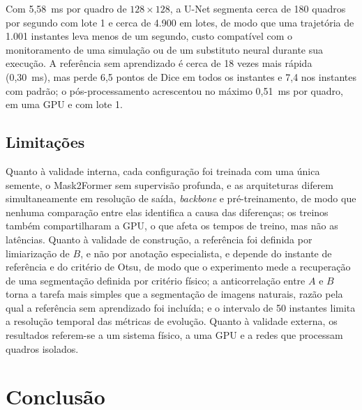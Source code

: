 \documentclass[final,5p,times,twocolumn]{elsarticle}
\begin{document}
Com 5,58~ms por quadro de $128\times128$, a U-Net segmenta cerca de 180 quadros por segundo com lote 1 e cerca de 4.900 em lotes, de modo que uma trajetória de 1.001 instantes leva menos de um segundo, custo compatível com o monitoramento de uma simulação ou de um substituto neural durante sua execução. A referência sem aprendizado é cerca de 18 vezes mais rápida (0,30~ms), mas perde 6,5 pontos de Dice em todos os instantes e 7,4 nos instantes com padrão; o pós-processamento acrescentou no máximo 0,51~ms por quadro, em uma GPU e com lote 1.

\subsection{Limitações}\label{subsec:limitations}

Quanto à validade interna, cada configuração foi treinada com uma única semente, o Mask2Former sem supervisão profunda, e as arquiteturas diferem simultaneamente em resolução de saída, \textit{backbone} e pré-treinamento, de modo que nenhuma comparação entre elas identifica a causa das diferenças; os treinos também compartilharam a GPU, o que afeta os tempos de treino, mas não as latências. Quanto à validade de construção, a referência foi definida por limiarização de $B$, e não por anotação especialista, e depende do instante de referência e do critério de Otsu, de modo que o experimento mede a recuperação de uma segmentação definida por critério físico; a anticorrelação entre $A$ e $B$ torna a tarefa mais simples que a segmentação de imagens naturais, razão pela qual a referência sem aprendizado foi incluída; e o intervalo de 50 instantes limita a resolução temporal das métricas de evolução. Quanto à validade externa, os resultados referem-se a um sistema físico, a uma GPU e a redes que processam quadros isolados.

\section{Conclusão}\label{sec:conclusions}
\end{document}
